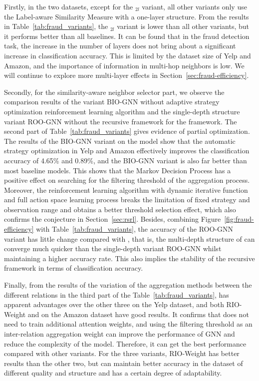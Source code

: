 Firstly, in the two datasets, except for the \RioGNN$_{2l}$ variant, all other variants only use the Label-aware Similarity Measure with a one-layer structure.
From the results in Table~\ref{tab:fraud_variants}, the \RioGNN$_{2l}$ variant is lower than all other variants, but it performs better than all baselines.
It can be found that in the fraud detection task, the increase in the number of layers does not bring about a significant increase in classification accuracy.
This is limited by the dataset size of Yelp and Amazon, and the importance of information in multi-hop neighbors is low.
We will continue to explore more multi-layer effects in Section~\ref{sec:fraud-efficiency}.



Secondly, for the similarity-aware neighbor selector part, we observe the comparison results of the variant BIO-GNN without adaptive strategy optimization reinforcement learning algorithm and the single-depth structure variant ROO-GNN without the recursive framework for the \RSRL framework.
The second part of Table~\ref{tab:fraud_variants} gives evidence of partial optimization. 
The results of the BIO-GNN variant on the \RioGNN model show that the automatic strategy optimization in Yelp and Amazon effectively improves the classification accuracy of 4.65\% and 0.89\%, and the BIO-GNN variant is also far better than most baseline models.
This shows that the Markov Decision Process has a positive effect on searching for the filtering threshold of the aggregation process.
Moreover, the reinforcement learning algorithm with dynamic iterative function and full action space learning process breaks the limitation of fixed strategy and observation range and obtains a better threshold selection effect, which also confirms the conjecture in Section~\ref{sec:rsrl}. 
Besides, combining Figure~\ref{fig:fraud-efficiency} with Table~\ref{tab:fraud_variants}, the accuracy of the ROO-GNN variant has little change compared with \RioGNN, that is, the multi-depth structure of \RioGNN can converge much quicker than the single-depth variant ROO-GNN whilst maintaining a higher accuracy rate.
This also implies the stability of the recursive framework in terms of classification accuracy.


Finally, from the results of the variation of the aggregation methods between the different relations in the third part of the Table~\ref{tab:fraud_variants}, \RioGNN has apparent advantages over the other three on the Yelp dataset, and both RIO-Weight and \RioGNN on the Amazon dataset have good results.
It confirms that \RioGNN does not need to train additional attention weights, and using the filtering threshold as an inter-relation aggregation weight can improve the performance of GNN and reduce the complexity of the model.
Therefore, it can get the best performance compared with other variants.
For the three variants, RIO-Weight has better results than the other two, but \RioGNN can maintain better accuracy in the dataset of different quality and structure and has a certain degree of adaptability.



